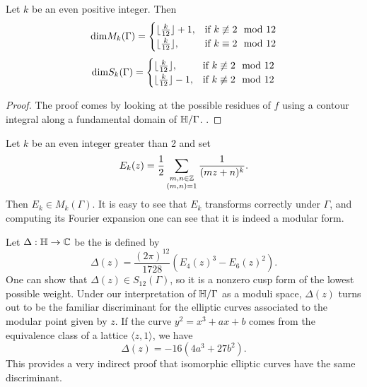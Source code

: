 \documentclass[12pt, a4paper]{report}
\begin{document}
\begin{prop}
  Let $k$ be an even positive integer. Then
  \[\textnormal{dim}M_k(\Gamma) =
    \begin{cases}
      \lfloor \frac{k}{12}  \rfloor + 1, & \text{if } k \not\equiv 2 \mod{12} \\
      \lfloor \frac{k}{12}  \rfloor, & \text{if } k \equiv 2 \mod{12} \\
    \end{cases}
\]
  \[\textnormal{dim}S_k(\Gamma) =
    \begin{cases}
      \lfloor \frac{k}{12}  \rfloor, & \text{if } k \not\equiv 2 \mod{12} \\
      \lfloor \frac{k}{12}  \rfloor - 1, & \text{if } k \not\equiv 2 \mod{12} \\
    \end{cases}
\]
\end{prop}
\begin{proof}
  The proof comes by looking at the possible residues of $f$ using a contour
  integral along a fundamental domain of $\mathbb{H} / \Gamma$.
  \cite[See][Propositions 8-9, Pages 115-118]{koblitz}. 
\end{proof}

\begin{example}
  Let $k$ be an even integer greater than 2 and set
  \[E_k(z) = \frac{1}{2} \sum_{\substack{m,n \in {\mathbb Z} \\ (m,n) =1}} \frac{1}{(mz+n)^k}.\]
  Then $E_k \in M_k(\Gamma).$ It is easy to see that $E_k$ transforms correctly
  under $\Gamma$, and computing its Fourier expansion one can see that it is
  indeed a modular form.
\end{example}

\begin{example}
  Let $\Delta : \mathbb{H} \rightarrow {\mathbb C} $ be the  is defined by
  \[\Delta(z) = \frac{(2\pi)^{12}}{1728} \left( E_4(z)^3 - E_6(z)^2 \right).\]
  One can show that $\Delta(z) \in S_{12}(\Gamma)$, so it is a nonzero
  cusp form of the lowest
  possible weight. Under our interpretation of $\mathbb{H}/\Gamma$ as a moduli space,
  $\Delta(z)$ turns out to be the familiar discriminant for
  the elliptic curves associated to the modular point given by $z$.
  If the curve $y^2 = x^3 + ax + b$ comes from the equivalence class of a lattice
  $\langle z,1 \rangle$, we have
  \[\Delta(z) = -16(4a^3 + 27b^2).\]
  This provides a very indirect proof that isomorphic elliptic curves have
  the same discriminant.
\end{example}
\end{document}
